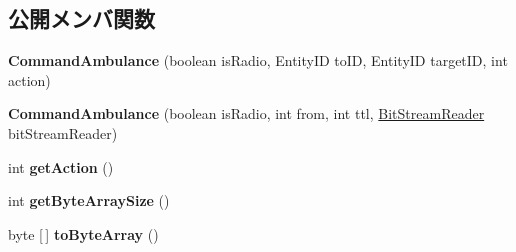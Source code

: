 \subsection*{公開メンバ関数}
\begin{DoxyCompactItemize}
\item 
\hypertarget{classadf_1_1agent_1_1communication_1_1standard_1_1bundle_1_1centralized_1_1CommandAmbulance_af4c58ca174dd264b77e8437cd349f7d5}{}\label{classadf_1_1agent_1_1communication_1_1standard_1_1bundle_1_1centralized_1_1CommandAmbulance_af4c58ca174dd264b77e8437cd349f7d5} 
{\bfseries Command\+Ambulance} (boolean is\+Radio, Entity\+ID to\+ID, Entity\+ID target\+ID, int action)
\item 
\hypertarget{classadf_1_1agent_1_1communication_1_1standard_1_1bundle_1_1centralized_1_1CommandAmbulance_a48208b238525c43b3b343f574b14608d}{}\label{classadf_1_1agent_1_1communication_1_1standard_1_1bundle_1_1centralized_1_1CommandAmbulance_a48208b238525c43b3b343f574b14608d} 
{\bfseries Command\+Ambulance} (boolean is\+Radio, int from, int ttl, \hyperlink{classadf_1_1component_1_1communication_1_1util_1_1BitStreamReader}{Bit\+Stream\+Reader} bit\+Stream\+Reader)
\item 
\hypertarget{classadf_1_1agent_1_1communication_1_1standard_1_1bundle_1_1centralized_1_1CommandAmbulance_a0fdaa5d090d6c487e2c7664e190160e1}{}\label{classadf_1_1agent_1_1communication_1_1standard_1_1bundle_1_1centralized_1_1CommandAmbulance_a0fdaa5d090d6c487e2c7664e190160e1} 
int {\bfseries get\+Action} ()
\item 
\hypertarget{classadf_1_1agent_1_1communication_1_1standard_1_1bundle_1_1centralized_1_1CommandAmbulance_aaf0888999907ffc19c94654fb56cbefb}{}\label{classadf_1_1agent_1_1communication_1_1standard_1_1bundle_1_1centralized_1_1CommandAmbulance_aaf0888999907ffc19c94654fb56cbefb} 
int {\bfseries get\+Byte\+Array\+Size} ()
\item 
\hypertarget{classadf_1_1agent_1_1communication_1_1standard_1_1bundle_1_1centralized_1_1CommandAmbulance_ae22089145f07edd60988c11068d511eb}{}\label{classadf_1_1agent_1_1communication_1_1standard_1_1bundle_1_1centralized_1_1CommandAmbulance_ae22089145f07edd60988c11068d511eb} 
byte \mbox{[}$\,$\mbox{]} {\bfseries to\+Byte\+Array} ()
\item 
\hypertarget{classadf_1_1agent_1_1communication_1_1standard_1_1bundle_1_1centralized_1_1CommandAmbulance_a8bc9847a401dbf94039f2ca30cc36590}{}\label{classadf_1_1agent_1_1communication_1_1standard_1_1bundle_1_1centralized_1_1CommandAmbulance_a8bc9847a401dbf94039f2ca30cc36590} 

\end{DoxyCompactItemize}

